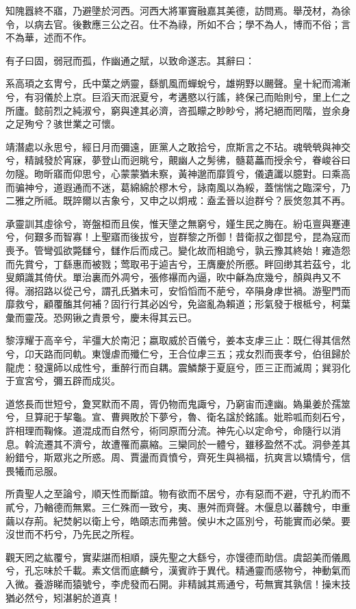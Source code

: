 \begin{pinyinscope}
知隗囂終不寤，乃避墬於河西。河西大將軍竇融嘉其美德，訪問焉。舉茂材，為徐令，以病去官。後數應三公之召。仕不為祿，所如不合；學不為人，博而不俗；言不為華，述而不作。

有子曰固，弱冠而孤，作幽通之賦，以致命遂志。其辭曰：

系高頊之玄冑兮，氏中葉之炳靈，繇凱風而蟬蛻兮，雄朔野以颺聲。皇十紀而鴻漸兮，有羽儀於上京。巨滔天而泯夏兮，考遘愍以行謠，終保己而貽則兮，里上仁之所廬。懿前烈之純淑兮，窮與達其必濟，咨孤矇之眇眇兮，將圮絕而罔階，豈余身之足殉兮？骇世業之可懷。

靖潛處以永思兮，經日月而彌遠，匪黨人之敢拾兮，庶斯言之不玷。魂煢煢與神交兮，精誠發於宵寐，夢登山而迥眺兮，覿幽人之髣彿，髓葛藟而授余兮，眷峻谷曰勿隧。昒昕寤而仰思兮，心蒙蒙猶未察，黃神邈而靡質兮，儀遺讖以臆對。曰乘高而骗神兮，道遐通而不迷，葛綿綿於樛木兮，詠南風以為綏，蓋惴惴之臨深兮，乃二雅之所祗。既誶爾以吉象兮，又申之以炯戒：盍孟晉以迨群兮？辰焂忽其不再。

承靈訓其虛徐兮，嵜盤桓而且俟，惟天墬之無窮兮，嫤生民之脢在。紛屯亶與蹇連兮，何艱多而智寡！上聖寤而後拔兮，豈群黎之所御！昔衛叔之御昆兮，昆為寇而喪予。管彎弧欲斃讎兮，讎作后而成己。變化故而相詭兮，孰云豫其終始！雍造怨而先賞兮，丁繇惠而被戮；莺取弔于逌吉兮，王膺慶於所慼。畔回缈其若茲兮，北叟頗識其倚伏。單治裏而外凋兮，張修襮而內逼，欥中龢為庶幾兮，顏與冉又不得。溺招路以從己兮，謂孔氏猶未可，安慆慆而不萉兮，卒隕身虖世禍。游聖門而靡救兮，顧覆醢其何補？固行行其必凶兮，免盜亂為賴道；形氣發于根柢兮，柯葉彙而靈茂。恐网锹之責景兮，慶未得其云已。

黎淳耀于高辛兮，羋彊大於南汜；嬴取威於百儀兮，姜本支虖三止：既仁得其信然兮，卬天路而同軌。東馒虐而殲仁兮，王合位虖三五；戎女烈而喪孝兮，伯徂歸於龍虎：發還師以成性兮，重醉行而自耦。震鱗漦于夏庭兮，匝三正而滅周；巽羽化于宣宮兮，彌五辟而成災。

道悠長而世短兮，夐冥默而不周，胥仍物而鬼諏兮，乃窮宙而達幽。媯巢姜於孺筮兮，旦算祀于挈龜。宣、曹興敗於下夢兮，魯、衛名諡於銘謠。妣聆呱而刻石兮，許相理而鞠條。道混成而自然兮，術同原而分流。神先心以定命兮，命隨行以消息。斡流遷其不濟兮，故遭罹而贏縮。三欒同於一體兮，雖移盈然不忒。洞參差其紛錯兮，斯眾兆之所惑。周、賈盪而貢憤兮，齊死生與禍福，抗爽言以矯情兮，信畏犧而忌服。

所貴聖人之至論兮，順天性而斷誼。物有欲而不居兮，亦有惡而不避，守孔約而不貳兮，乃輶德而無累。三仁殊而一致兮，夷、惠舛而齊聲。木偃息以蕃魏兮，申重繭以存荊。紀焚躬以衛上兮，皓頤志而弗營。侯屮木之區別兮，苟能實而必榮。要沒世而不朽兮，乃先民之所程。

觀天罔之紘覆兮，實棐諶而相順，謨先聖之大繇兮，亦馒德而助信。虞韶美而儀鳳兮，孔忘味於千載。素文信而底麟兮，漢賓祚于異代。精通靈而感物兮，神動氣而入微。養游睇而猿號兮，李虎發而石開。非精誠其焉通兮，苟無實其孰信！操末技猶必然兮，矧湛躬於道真！


\end{pinyinscope}
